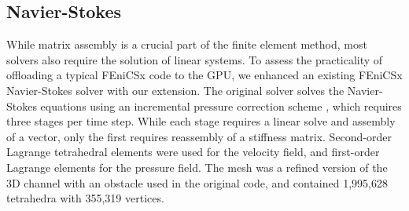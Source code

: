 \subsection*{Navier-Stokes}

While matrix assembly is a crucial part of the finite element method, most solvers also require the solution of linear systems. To assess the practicality of offloading a typical FEniCSx code to the GPU, we enhanced an existing FEniCSx Navier-Stokes solver \cite{dokkenipcs} with our extension. The original solver solves the Navier-Stokes equations using an incremental pressure correction scheme \cite{dokken2019shape}, which requires three stages per time step. While each stage requires a linear solve and assembly of a vector, only the first requires reassembly of a stiffness matrix. Second-order Lagrange tetrahedral elements were used for the velocity field, and first-order Lagrange elements for the pressure field. The mesh was a refined version of the 3D channel with an obstacle used in the original code, and contained 1,995,628 tetrahedra with 355,319 vertices.

